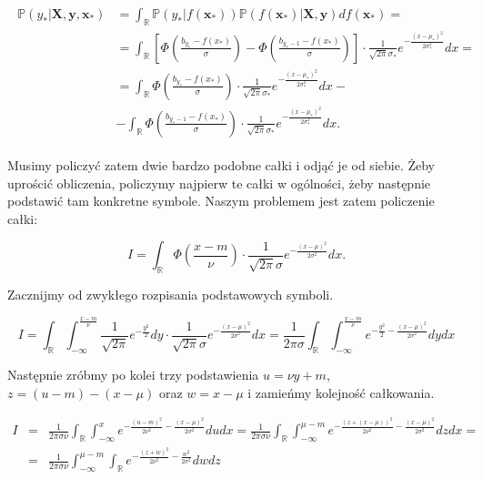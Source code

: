 \documentclass{mini}
\begin{document}
\begin{align}\label{dlugacalka}
\begin{split}
\mathbb{P}(y_{\ast} | \textbf{X}, \textbf{y}, \mathbf{x}_{\ast}) &= \int_{\mathbb{R}} \mathbb{P}(y_{\ast} | f(\mathbf{x}_{\ast}))\mathbb{P}(f(\mathbf{x}_{\ast}) | \textbf{X}, \textbf{y}) df(\mathbf{x}_{\ast})=\\
&=\int_{\mathbb{R}} 
\left[   
\Phi \left( \frac{b_{y_{\ast}}-f(x_\ast)}{\sigma} \right)-
\Phi \left( \frac{b_{y_{\ast}-1}-f(x_\ast)}{\sigma} \right)
\right]\cdot \frac{1}{\sqrt{2\pi}\sigma_\ast}e^{-\frac{(x-\mu_\ast)^2}{2\sigma_\ast^2}} dx=\\
&=
\int_{\mathbb{R}}  
\Phi \left( \frac{b_{y_{\ast}}-f(x_\ast)}{\sigma} \right)
\cdot \frac{1}{\sqrt{2\pi}\sigma_\ast}e^{-\frac{(x-\mu_\ast)^2}{2\sigma_\ast^2}} dx -\\&-
\int_{\mathbb{R}}  
\Phi \left( \frac{b_{y_{\ast}-1}-f(x_\ast)}{\sigma} \right)
\cdot \frac{1}{\sqrt{2\pi}\sigma_\ast}e^{-\frac{(x-\mu_\ast)^2}{2\sigma_\ast^2}} dx.
\end{split}
\end{align}

Musimy policzyć zatem dwie bardzo podobne całki i odjąć je od siebie. Żeby uprościć obliczenia, policzymy najpierw te całki w ogólności, żeby następnie podstawić tam konkretne symbole. Naszym problemem jest zatem policzenie całki:

$$
I=\int_{\mathbb{R}}  
\Phi \left( \frac{x-m}{\nu}\right)
\cdot \frac{1}{\sqrt{2\pi}\sigma}e^{-\frac{(x-\mu)^2}{2\sigma^2}} dx.
$$

Zacznijmy od zwykłego rozpisania podstawowych symboli.

$$
I = \int_\mathbb{R}\int_{-\infty}^{\frac{x-m}{\nu}} \frac{1}{\sqrt{2\pi}}e^{-\frac{y^2}{2}} dy \cdot \frac{1}{\sqrt{2\pi}\sigma}e^{-\frac{(x-\mu)^2}{2\sigma^2}} dx
= 
\frac{1}{2\pi\sigma}\int_\mathbb{R}\int_{-\infty}^{\frac{x-m}{\nu}} e^{-\frac{y^2}{2} - \frac{(x-\mu)^2}{2\sigma^2}} dy dx
$$

Następnie zróbmy po kolei trzy podstawienia $u = \nu y+m$, $z=(u-m)-(x-\mu)$ oraz $w=x-\mu$ i zamieńmy kolejność całkowania. 

\begin{eqnarray*}
I &=&
\frac{1}{2\pi\sigma\nu}\int_\mathbb{R}\int_{-\infty}^{x} e^{-\frac{(u-m)^2}{2\nu^2} - \frac{(x-\mu)^2}{2\sigma^2}} du dx
=
\frac{1}{2\pi\sigma\nu}\int_\mathbb{R}\int_{-\infty}^{\mu-m} e^{-\frac{(z+(x-\mu))^2}{2\nu^2} - \frac{(x-\mu)^2}{2\sigma^2}} dz dx=\\
&=&
\frac{1}{2\pi\sigma\nu}\int_{-\infty}^{\mu-m}\int_\mathbb{R} e^{-\frac{(z+w)^2}{2\nu^2} - \frac{w^2}{2\sigma^2}} dw dz
\end{eqnarray*}
\end{document}
